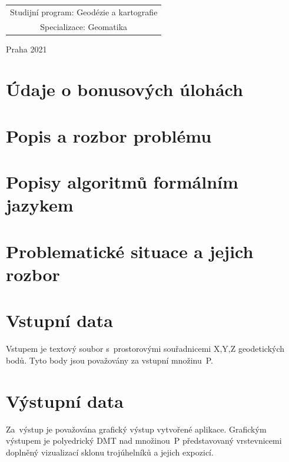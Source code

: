 \documentclass[a4paper, 12pt, oneside, titlepage]{article} %
\begin{document}
\begin{center}
\begin{tabular}{c}
Studijní program: Geodézie a kartografie \\
\noalign{\vspace{2mm}}

Specializace: Geomatika\\

\end{tabular}


\vfill

Praha 2021

\end{center}



\clearpage
\section{Údaje o bonusových úlohách}




\section{Popis a rozbor problému}




\section{Popisy algoritmů formálním jazykem} \label{popisalg}





\section{Problematické situace a jejich rozbor} \label{problemrozbor}




\section{Vstupní data}
Vstupem je textový soubor s~prostorovými souřadnicemi X,Y,Z geodetických bodů. Tyto body jsou považovány za vstupní množinu~P.


\section{Výstupní data}
Za~výstup je považována grafický výstup vytvořené aplikace. Grafickým výstupem je polyedrický DMT nad množinou~P představovaný vrstevnicemi doplněný vizualizací sklonu trojúhelníků a jejich expozicí. 
\end{document}

